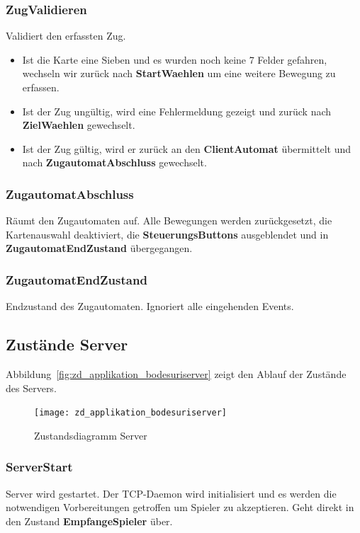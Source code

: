 \documentclass[12pt,halfparskip]{scrartcl}
\begin{document}
\subsubsection{ZugValidieren}
\label{ssub:zugvalidieren}
Validiert den erfassten Zug.
\begin{itemize}
	\item Ist die Karte eine Sieben und es wurden noch keine 7 Felder gefahren, wechseln wir zurück nach \textbf{StartWaehlen} um eine weitere Bewegung zu erfassen.
	\item Ist der Zug ungültig, wird eine Fehlermeldung gezeigt und zurück nach \textbf{ZielWaehlen} gewechselt.
	\item Ist der Zug gültig, wird er zurück an den \textbf{ClientAutomat} übermittelt und nach \textbf{ZugautomatAbschluss} gewechselt.
\end{itemize}

\subsubsection{ZugautomatAbschluss}
\label{ssub:zugautomatabschluss}
Räumt den Zugautomaten auf. Alle Bewegungen werden zurückgesetzt, die Kartenauswahl deaktiviert, die \textbf{SteuerungsButtons} ausgeblendet und in \textbf{ZugautomatEndZustand} übergegangen.

\subsubsection{ZugautomatEndZustand}
\label{ssub:zugautomatendzustand}
Endzustand des Zugautomaten. Ignoriert alle eingehenden Events.


\subsection{Zustände Server}
\label{sub:zustände_server}

Abbildung~\vref{fig:zd_applikation_bodesuriserver} zeigt den Ablauf der Zustände des Servers.

\begin{figure}[h]
	\centering
	\texttt{[image: zd\_applikation\_bodesuriserver]}
	\caption{Zustandsdiagramm Server}
	\label{fig:zd_applikation_bodesuriserver}
\end{figure}

\subsubsection{ServerStart}
\label{ssub:serverStart}
Server wird gestartet. Der TCP-Daemon wird initialisiert und es werden die notwendigen Vorbereitungen getroffen um Spieler zu akzeptieren. Geht direkt in den Zustand \textbf{EmpfangeSpieler} über.
\end{document}
